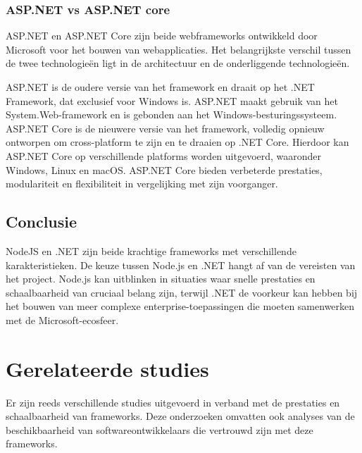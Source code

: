 \subsubsection*{ASP.NET vs ASP.NET core}%
ASP.NET en ASP.NET Core zijn beide webframeworks ontwikkeld door Microsoft voor het bouwen van webapplicaties. Het belangrijkste verschil tussen de twee technologieën ligt in de architectuur en de onderliggende technologieën.

ASP.NET is de oudere versie van het framework en draait op het .NET Framework,
dat exclusief voor Windows is. ASP.NET maakt gebruik van het
System.Web-framework en is gebonden aan het Windows-besturingssysteem.
\smallbreak
ASP.NET Core is de nieuwere versie van het framework, volledig opnieuw ontworpen om cross-platform te zijn en te draaien op .NET Core.
Hierdoor kan ASP.NET Core op verschillende platforms worden uitgevoerd,
waaronder Windows, Linux en macOS. ASP.NET Core bieden verbeterde prestaties,
modulariteit en flexibiliteit in vergelijking met zijn voorganger.



\subsection*{Conclusie}%
NodeJS en .NET zijn beide krachtige frameworks met verschillende
karakteristieken. De keuze tussen Node.js en .NET hangt af van de vereisten van
het project. Node.js kan uitblinken in situaties waar snelle prestaties en
schaalbaarheid van cruciaal belang zijn, terwijl .NET de voorkeur kan hebben
bij het bouwen van meer complexe enterprise-toepassingen die moeten samenwerken
met de Microsoft-ecosfeer.\autocite{Hutsulyak2023}

\section*{Ge\-rel\-at\-eerde studies}%
Er zijn reeds verschillende studies uitgevoerd in verband met de pre\-sta\-ties en schaalbaarheid van frameworks\autocite{Daityari2023}.  Deze onderzoeken omvatten ook analyses van de beschikbaarheid van soft\-ware\-ont\-wik\-kel\-aars die vertrouwd zijn met deze frameworks.

